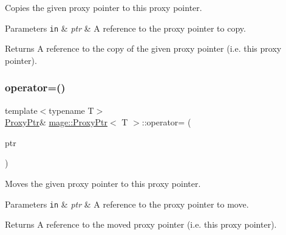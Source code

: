 Copies the given proxy pointer to this proxy pointer.


\begin{DoxyParams}[1]{Parameters}
\mbox{\tt in}  & {\em ptr} & A reference to the proxy pointer to copy. \\
\hline
\end{DoxyParams}
\begin{DoxyReturn}{Returns}
A reference to the copy of the given proxy pointer (i.\+e. this proxy pointer). 
\end{DoxyReturn}
\hypertarget{classmage_1_1_proxy_ptr_a53e38a57d8155b8cd59b3d6e332995b7}{}\label{classmage_1_1_proxy_ptr_a53e38a57d8155b8cd59b3d6e332995b7} 
\subsubsection{\texorpdfstring{operator=()}{operator=()}\hspace{0.1cm}{\footnotesize\ttfamily [2/2]}}
{\footnotesize\ttfamily template$<$typename T$>$ \\
\hyperlink{classmage_1_1_proxy_ptr}{Proxy\+Ptr}\& \hyperlink{classmage_1_1_proxy_ptr}{mage\+::\+Proxy\+Ptr}$<$ T $>$\+::operator= (\begin{DoxyParamCaption}\item[{\hyperlink{classmage_1_1_proxy_ptr}{Proxy\+Ptr}$<$ T $>$ \&\&}]{ptr }\end{DoxyParamCaption})\hspace{0.3cm}{\ttfamily [noexcept]}}

Moves the given proxy pointer to this proxy pointer.


\begin{DoxyParams}[1]{Parameters}
\mbox{\tt in}  & {\em ptr} & A reference to the proxy pointer to move. \\
\hline
\end{DoxyParams}
\begin{DoxyReturn}{Returns}
A reference to the moved proxy pointer (i.\+e. this proxy pointer). 
\end{DoxyReturn}
\hypertarget{classmage_1_1_proxy_ptr_a786d92c5d87ac0349a60cf99642bd890}{}\label{classmage_1_1_proxy_ptr_a786d92c5d87ac0349a60cf99642bd890} 
